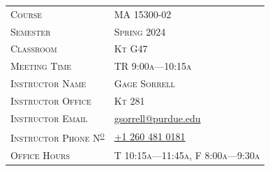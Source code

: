 \documentclass[letterpaper,twoside]{article}
\begin{document}
\begin{titlepage}
\begin{center}
        \vspace*{0.25in}
        \large
        \begin{table}[H]
            \centering
            \doublespacing
            \hspace*{20mm}\begin{tabular}{ll}
                \textsc{Course} & \textsc{MA 15300-02} \\
                \textsc{Semester} & \textsc{Spring 2024}\\
                \textsc{Classroom} & \textsc{Kt G47} \\
                \textsc{Meeting Time} & \textsc{TR 9:00a---10:15a} \\
                \textsc{Instructor Name} & \textsc{Gage Sorrell} \\
                \textsc{Instructor Office} & \textsc{Kt 281} \\
                \textsc{Instructor Email} & \href{mailto:gsorrell@purdue.edu}{gsorrell@purdue.edu} \\
                \textsc{Instructor Phone N\textsuperscript{\underline{\scriptsize o}}}& \href{tel:12604810181}{+1 260 481 0181} \\
                \textsc{Office Hours} & \textsc{T 10:15a---11:45a, F 8:00a---9:30a} \\
            \end{tabular}
        \end{table}
        \vspace*{\fill}

\end{center}
\end{titlepage}
\end{document}
